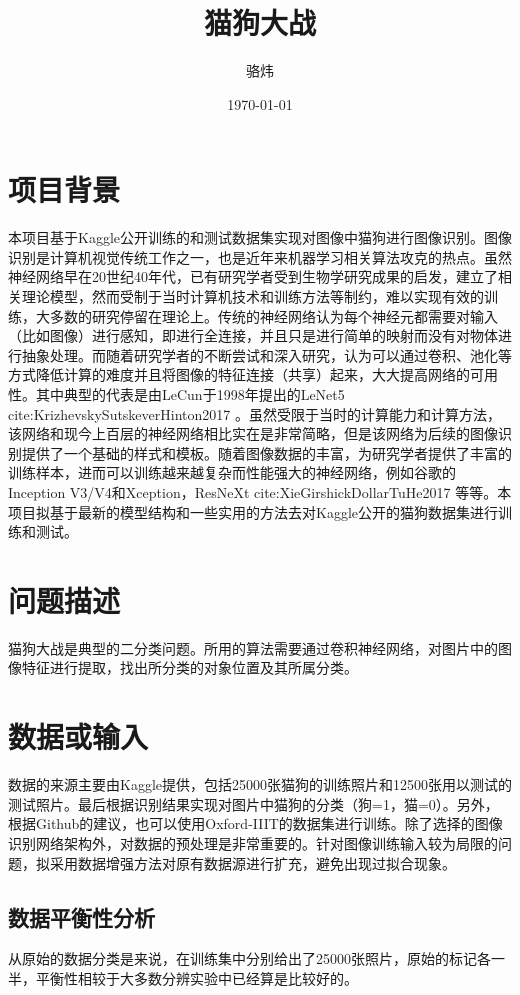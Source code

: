 \documentclass[a4paper,11pt]{article}
\author{骆炜}
\date{\today}
\title{猫狗大战}
\begin{document}
\maketitle
\tableofcontents


\section{项目背景}
\label{sec-1}
本项目基于Kaggle公开训练的和测试数据集实现对图像中猫狗进行图像识别。图像识别是计算机视觉传统工作之一，也是近年来机器学习相关算法攻克的热点。虽然神经网络早在20世纪40年代，已有研究学者受到生物学研究成果的启发，建立了相关理论模型，然而受制于当时计算机技术和训练方法等制约，难以实现有效的训练，大多数的研究停留在理论上。传统的神经网络认为每个神经元都需要对输入（比如图像）进行感知，即进行全连接，并且只是进行简单的映射而没有对物体进行抽象处理。而随着研究学者的不断尝试和深入研究，认为可以通过卷积、池化等方式降低计算的难度并且将图像的特征连接（共享）起来，大大提高网络的可用性。其中典型的代表是由LeCun于1998年提出的LeNet5 cite:KrizhevskySutskeverHinton2017 。虽然受限于当时的计算能力和计算方法，该网络和现今上百层的神经网络相比实在是非常简略，但是该网络为后续的图像识别提供了一个基础的样式和模板。随着图像数据的丰富，为研究学者提供了丰富的训练样本，进而可以训练越来越复杂而性能强大的神经网络，例如谷歌的Inception V3/V4和Xception，ResNeXt cite:XieGirshickDollarTuHe2017 等等。本项目拟基于最新的模型结构和一些实用的方法去对Kaggle公开的猫狗数据集进行训练和测试。
\section{问题描述}
\label{sec-2}
猫狗大战是典型的二分类问题。所用的算法需要通过卷积神经网络，对图片中的图像特征进行提取，找出所分类的对象位置及其所属分类。
\section{数据或输入}
\label{sec-3}
数据的来源主要由Kaggle提供，包括25000张猫狗的训练照片和12500张用以测试的测试照片。最后根据识别结果实现对图片中猫狗的分类（狗=1，猫=0）。另外，根据Github的建议，也可以使用Oxford-IIIT的数据集进行训练。除了选择的图像识别网络架构外，对数据的预处理是非常重要的。针对图像训练输入较为局限的问题，拟采用数据增强方法对原有数据源进行扩充，避免出现过拟合现象。

\subsection{数据平衡性分析}
\label{sec-3-1}
从原始的数据分类是来说，在训练集中分别给出了25000张照片，原始的标记各一半，平衡性相较于大多数分辨实验中已经算是比较好的。
\end{document}
